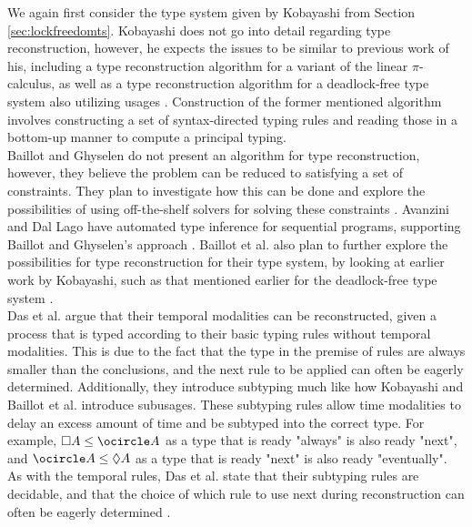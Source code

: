 
We again first consider the type system given by Kobayashi from Section \ref{sec:lockfreedomts}. Kobayashi does not go into detail regarding type reconstruction, however, he expects the issues to be similar to previous work of his, including a type reconstruction algorithm for a variant of the linear $\pi$-calculus, as well as a type reconstruction algorithm for a deadlock-free type system also utilizing usages \cite{Igarashi1997TypeBasedAO, KobayashiEtAl2000}. Construction of the former mentioned algorithm involves constructing a set of syntax-directed typing rules and reading those in a bottom-up manner to compute a principal typing.\\

Baillot and Ghyselen do not present an algorithm for type reconstruction, however, they believe the problem can be reduced to satisfying a set of constraints. They plan to investigate how this can be done and explore the possibilities of using off-the-shelf solvers for solving these constraints \cite{BaillotGhyselen2021}. Avanzini and Dal Lago have automated type inference for sequential programs, supporting Baillot and Ghyselen's approach \cite{AvanziniLago2017}. Baillot et al. also plan to further explore the possibilities for type reconstruction for their type system, by looking at earlier work by Kobayashi, such as that mentioned earlier for the deadlock-free type system \cite{BaillotEtAl2021}.\\

Das et al. argue that their temporal modalities can be reconstructed, given a process that is typed according to their basic typing rules without temporal modalities. This is due to the fact that the type in the premise of rules are always smaller than the conclusions, and the next rule to be applied can often be eagerly determined. Additionally, they introduce subtyping much like how Kobayashi and Baillot et al. introduce subusages. These subtyping rules allow time modalities to delay an excess amount of time and be subtyped into the correct type. For example, $\Box A \leq \ocircle A$ as a type that is ready "always" is also ready "next", and $\ocircle A \leq \lozenge A$ as a type that is ready "next" is also ready "eventually". As with the temporal rules, Das et al. state that their subtyping rules are decidable, and that the choice of which rule to use next during reconstruction can often be eagerly determined \cite{DasEtAl2018}.